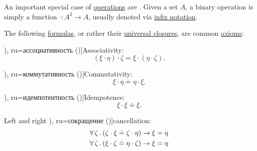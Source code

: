 \begin{definition}\label{def:binary_operation}
  An important special case of \hyperref[def:operation_on_set]{operations} are . Given a set \( A \), a binary operation is simply a function \( \cdot: A^2 \to A \), usually denoted via \hyperref[rem:first_order_formula_conventions/infix]{infix notation}.

  The following \hyperref[def:first_order_syntax/formula]{formulas}, or rather their \hyperref[def:universal_closure]{universal closures}, are common \hyperref[def:first_order_theory/axiomatized]{axioms}:
  \begin{thmenum}
     \term[bg=асоциативност (\cite[prop. 1.13]{Соскова2015}), ru=ассоциативность (\cite[21]{Яблонский1986})]{Associativity}:
    \begin{equation}\label{eq:def:binary_operation/associative}
      (\xi \cdot \eta) \cdot \zeta = \xi \cdot (\eta \cdot \zeta).
    \end{equation}

     \term[bg=комутативност (\cite[prop. 1.13]{Соскова2015}), ru=коммутативность (\cite[21]{Яблонский1986})]{Commutativity}:
    \begin{equation}\label{eq:def:binary_operation/commutative}
      \xi \cdot \eta \doteq \eta \cdot \xi.
    \end{equation}

     \term[bg=идемпотентност (\cite[prop. 1.13]{Соскова2015}), ru=идемпотентность (\cite[90]{Мальцев1970})]{Idempotence}:
    \begin{equation}\label{eq:def:binary_operation/idempotent}
      \xi \cdot \xi \doteq \xi.
    \end{equation}

     Left and right \term[bg=съкращаване (\cite[4]{КоцевСидеров2016}), ru=сокращение (\cite[\( 1.18(\varepsilon) \)]{Ляпин1960})]{cancellation}:
    \begin{align}
      \forall \thinspace \zeta \thinspace . \thinspace (\zeta \cdot \xi \doteq \zeta \cdot \eta) \rightarrow \xi = \eta
      \label{eq:def:binary_operation/cancellative/left}
      \\
      \forall \thinspace \zeta \thinspace . \thinspace (\xi \cdot \zeta \doteq \eta \cdot \zeta) \rightarrow \xi = \eta
      \label{eq:def:binary_operation/cancellative/right}
    \end{align}
  \end{thmenum}
\end{definition}

